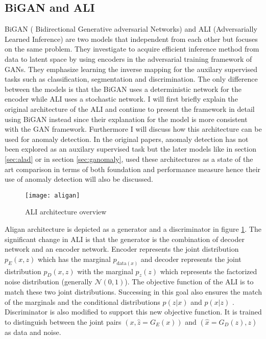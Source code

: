 \subsection{BiGAN and ALI}
\label{sec:bigan}

 BiGAN ( Bidirectional Generative adversarial Networks) \cite{Donahue2017AdversarialFL} and ALI
 (Adversarially Learned Inference) \cite{Dumoulin2017AdversariallyLI} are two models that
 independent from each other but focuses on the same problem. They investigate to acquire efficient
 inference method from data to latent space by using encoders in the adversarial training framework
 of GANs. They emphasize learning the inverse mapping for the auxilary supervised tasks such as
 classification, segmentation and discrimination. The only difference between the models is that the
 BiGAN uses a deterministic network for the encoder while ALI uses a stochastic network. I will
 first briefly explain the original architecture of the ALI and continue to present the framework in
 detail using BiGAN instead since their explanation for the model is more consistent with the GAN
 framework. Furthermore I will discuss how this architecture can be used for anomaly detection. In
 the original papers, anomaly detection has not been explored as an auxilary supervised task but the
 later models like in section \ref{sec:alad} or in section \ref{sec:ganomaly}, used these
 architectures as a state of the art comparison in terms of both foundation and performance measure
 hence their use of anomaly detection will also be discussed.

\begin{figure}[h!]
	\centering
	\texttt{[image: aligan]}
    \caption{ALI architecture overview}
    \label{fig:aligan_model}
\end{figure}

Aligan architecture is depicted as a generator and a discriminator in figure \ref{fig:aligan_model}.
The significant change in ALI is that the generator is the combination of decoder network and an
encoder network. Encoder represents the joint distribution $p_{E}(x, z)$ which has the marginal
$p_{\text{data}(x)}$ and decoder represents the joint distribution $p_{D}(x, z)$ with the marginal
$p_z(z)$ which represents the factorized noise distribution (generally $\mathcal{N}(0, 1)$). The
objective function of the ALI is to match these two joint distributions. Successing in this goal
also ensures the match of the marginals and the conditional distributions $p(z | x)$ and $p(x | z)$
. Discriminator is also modified to support this new objective function. It is trained to
distinguish between the joint pairs  $(x, \hat{z} = G_{E}(x))$ and $(\hat{x} = G_{D}(z), z)$ as data
and noise.


